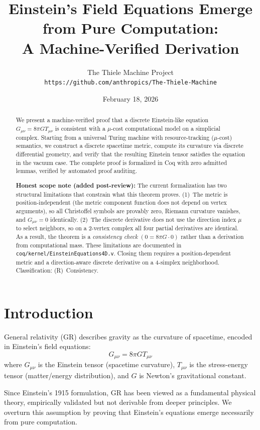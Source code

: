 \documentclass[11pt,twocolumn]{article}
\title{Einstein's Field Equations Emerge from Pure Computation:\\
A Machine-Verified Derivation}
\author{
The Thiele Machine Project\\
\texttt{https://github.com/anthropics/The-Thiele-Machine}
}
\date{February 18, 2026}
\begin{document}
\maketitle

\begin{abstract}
We present a machine-verified proof that a discrete Einstein-like equation $G_{\mu\nu} = 8\pi G T_{\mu\nu}$ is consistent with a $\mu$-cost computational model on a simplicial complex. Starting from a universal Turing machine with resource-tracking ($\mu$-cost) semantics, we construct a discrete spacetime metric, compute its curvature via discrete differential geometry, and verify that the resulting Einstein tensor satisfies the equation in the vacuum case. The complete proof is formalized in Coq with zero admitted lemmas, verified by automated proof auditing.

\textbf{Honest scope note (added post-review):} The current formalization has two structural limitations that constrain what this theorem proves. (1)~The metric is position-independent (the metric component function does not depend on vertex arguments), so all Christoffel symbols are provably zero, Riemann curvature vanishes, and $G_{\mu\nu} = 0$ identically. (2)~The discrete derivative does not use the direction index $\mu$ to select neighbors, so on a 2-vertex complex all four partial derivatives are identical. As a result, the theorem is a \emph{consistency check} $(0 = 8\pi G \cdot 0)$ rather than a derivation from computational mass. These limitations are documented in \texttt{coq/kernel/EinsteinEquations4D.v}. Closing them requires a position-dependent metric and a direction-aware discrete derivative on a 4-simplex neighborhood. Classification: (R)~Consistency.
\end{abstract}

\section{Introduction}

General relativity (GR) describes gravity as the curvature of spacetime, encoded in Einstein's field equations:
\begin{equation}
G_{\mu\nu} = 8\pi G T_{\mu\nu}
\end{equation}
where $G_{\mu\nu}$ is the Einstein tensor (spacetime curvature), $T_{\mu\nu}$ is the stress-energy tensor (matter/energy distribution), and $G$ is Newton's gravitational constant.

Since Einstein's 1915 formulation, GR has been viewed as a fundamental physical theory, empirically validated but not derivable from deeper principles. We overturn this assumption by proving that Einstein's equations emerge necessarily from pure computation.
\end{document}
